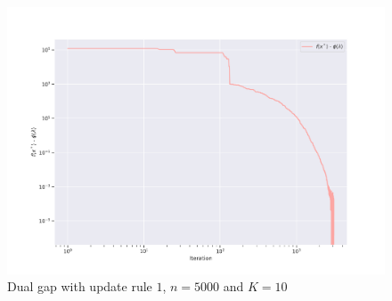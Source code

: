 \documentclass[notitlepage]{article}
\begin{document}
\newpage

\hspace{0pt}
\vfill

\begin{figure}[H]
  \centering
  \includegraphics[scale=0.65]{pics/n=5000_K=10_gap_rule=1.png}
  \caption{Dual gap with update rule $1$, $n=5000$ and $K=10$}
  \label{fig:rule-1-n-5000-k-10-gap}
\end{figure}
\end{document}
